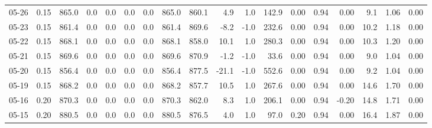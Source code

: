 \begin{threeparttable}
{\begin{tabular}{lrrrrrrrrrrrrrrrrr}
  05-26 &     0.15 & 865.0 &               0.0 &               0.0 &                0.0 &                0.0 & 865.0 & 860.1 &        4.9 &                      1.0 &               142.9 &       0.00 &      0.94 &           0.00 &              9.1 &            1.06 &                   0.00 \\
  05-23 &     0.15 & 861.4 &               0.0 &               0.0 &                0.0 &                0.0 & 861.4 & 869.6 &       -8.2 &                     -1.0 &               232.6 &       0.00 &      0.94 &           0.00 &             10.2 &            1.18 &                   0.00 \\
  05-22 &     0.15 & 868.1 &               0.0 &               0.0 &                0.0 &                0.0 & 868.1 & 858.0 &       10.1 &                      1.0 &               280.3 &       0.00 &      0.94 &           0.00 &             10.3 &            1.20 &                   0.00 \\
  05-21 &     0.15 & 869.6 &               0.0 &               0.0 &                0.0 &                0.0 & 869.6 & 870.9 &       -1.2 &                     -1.0 &                33.6 &       0.00 &      0.94 &           0.00 &              9.0 &            1.04 &                   0.00 \\
  05-20 &     0.15 & 856.4 &               0.0 &               0.0 &                0.0 &                0.0 & 856.4 & 877.5 &      -21.1 &                     -1.0 &               552.6 &       0.00 &      0.94 &           0.00 &              9.2 &            1.04 &                   0.00 \\
  05-19 &     0.15 & 868.2 &               0.0 &               0.0 &                0.0 &                0.0 & 868.2 & 857.7 &       10.5 &                      1.0 &               267.6 &       0.00 &      0.94 &           0.00 &             14.6 &            1.70 &                   0.00 \\
  05-16 &     0.20 & 870.3 &               0.0 &               0.0 &                0.0 &                0.0 & 870.3 & 862.0 &        8.3 &                      1.0 &               206.1 &       0.00 &      0.94 &          -0.20 &             14.8 &            1.71 &                   0.00 \\
  05-15 &     0.20 & 880.5 &               0.0 &               0.0 &                0.0 &                0.0 & 880.5 & 876.5 &        4.0 &                      1.0 &                97.0 &       0.20 &      0.94 &           0.00 &             16.4 &            1.87 &                   0.00 \\

\end{tabular}}
\end{threeparttable}
